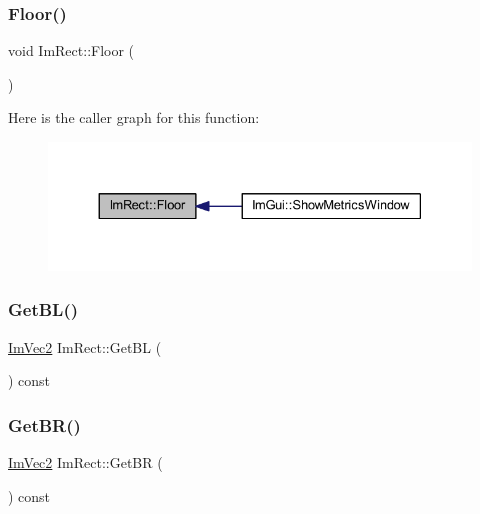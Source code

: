 \mbox{\label{struct_im_rect_a8fdf75a0c64ff29f65113cd9f8be77ab}} 
\subsubsection{\texorpdfstring{Floor()}{Floor()}}
{\footnotesize\ttfamily void Im\+Rect\+::\+Floor (\begin{DoxyParamCaption}{ }\end{DoxyParamCaption})\hspace{0.3cm}{\ttfamily [inline]}}

Here is the caller graph for this function\+:
\nopagebreak
\begin{figure}[H]
\begin{center}
\leavevmode
\includegraphics[width=330pt]{struct_im_rect_a8fdf75a0c64ff29f65113cd9f8be77ab_icgraph}
\end{center}
\end{figure}
\mbox{\label{struct_im_rect_a59d9751bc7be6745dddf5b83b9155669}} 
\subsubsection{\texorpdfstring{Get\+B\+L()}{GetBL()}}
{\footnotesize\ttfamily \mbox{\hyperlink{struct_im_vec2}{Im\+Vec2}} Im\+Rect\+::\+Get\+BL (\begin{DoxyParamCaption}{ }\end{DoxyParamCaption}) const\hspace{0.3cm}{\ttfamily [inline]}}

\mbox{\label{struct_im_rect_ad2f2687254beed5a9b19bde0d6fa14f5}} 
\subsubsection{\texorpdfstring{Get\+B\+R()}{GetBR()}}
{\footnotesize\ttfamily \mbox{\hyperlink{struct_im_vec2}{Im\+Vec2}} Im\+Rect\+::\+Get\+BR (\begin{DoxyParamCaption}{ }\end{DoxyParamCaption}) const\hspace{0.3cm}{\ttfamily [inline]}}

